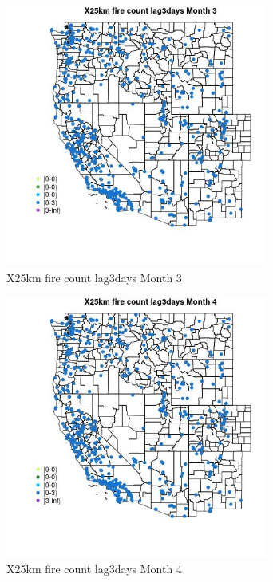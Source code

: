 \begin{figure} 
\centering  
\includegraphics[width=0.77\textwidth]{Code_Outputs/Report_ML_input_PM25_Step4_part_e_de_duplicated_aves_compiled_2019-05-14wNAs_MapObsMo3X25km_fire_count_lag3days.jpg} 
\caption{\label{fig:Report_ML_input_PM25_Step4_part_e_de_duplicated_aves_compiled_2019-05-14wNAsMapObsMo3X25km_fire_count_lag3days}X25km fire count lag3days Month 3} 
\end{figure} 
 

\begin{figure} 
\centering  
\includegraphics[width=0.77\textwidth]{Code_Outputs/Report_ML_input_PM25_Step4_part_e_de_duplicated_aves_compiled_2019-05-14wNAs_MapObsMo4X25km_fire_count_lag3days.jpg} 
\caption{\label{fig:Report_ML_input_PM25_Step4_part_e_de_duplicated_aves_compiled_2019-05-14wNAsMapObsMo4X25km_fire_count_lag3days}X25km fire count lag3days Month 4} 
\end{figure} 
 

